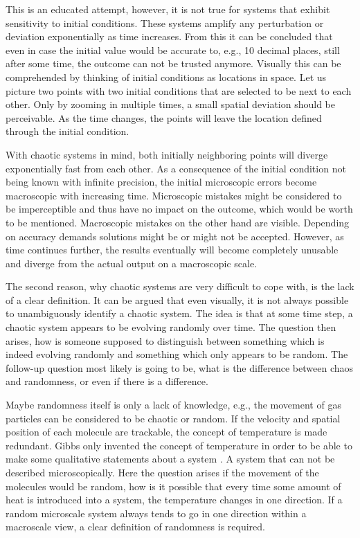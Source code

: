 This is 
an educated attempt, however, it is not true for systems that exhibit
sensitivity to initial conditions. These systems amplify any 
perturbation or deviation exponentially 
as time increases. From this it can be concluded
that even in case the initial value would be accurate to, e.g., 10 decimal places,
still after some time, the outcome can not be trusted anymore. 
Visually 
this can be comprehended by thinking of initial conditions
as locations in space. Let us picture two points with two initial conditions
that are selected to be next to each other. Only by zooming in multiple times, 
a small spatial deviation should be perceivable. 
As the time changes, the points will leave the location defined through the initial condition. \newline 


With 
chaotic systems in mind, both initially neighboring 
points will diverge exponentially fast from each other.
As a consequence of the initial condition not being
known with infinite precision, the initial microscopic
errors become macroscopic with increasing time. Microscopic mistakes 
might be considered to be imperceptible and thus have no impact 
on the outcome, which would be worth to be mentioned.
Macroscopic mistakes on the other hand are visible. Depending on 
accuracy demands solutions might be or might not be accepted.
However, as time continues further, the results eventually 
will become completely unusable and diverge from the actual output on a macroscopic scale.\newline 


The second reason, why chaotic systems are very difficult 
to cope with, is the lack of a clear definition. It can be 
argued that even visually, it is not always possible to
unambiguously identify a chaotic system. The idea 
is that at some time step, a chaotic system appears to 
be evolving randomly over time. The question then arises,
how is someone supposed to distinguish between something which 
is indeed evolving randomly and something which only appears 
to be random. The follow-up question most likely is going to be, 
what is the difference between chaos and randomness, or 
even if there is a difference. \newline 

Maybe randomness itself is only 
a lack of knowledge, e.g., the movement of gas particles 
can be considered to be chaotic or random. If the 
velocity and spatial position of each molecule are 
trackable, the concept of temperature is made 
redundant. Gibbs only invented the concept of temperature 
in order to be able to make some qualitative statements 
about a system \cite{Argyris2017}.
A system that can not be described microscopically.
Here the question arises if the movement of the molecules 
would be random, how is it possible that every time 
some amount of heat is introduced into a system, the temperature
changes in one direction. If a random microscale system 
always tends to go in one direction within a macroscale view,  
a clear definition of randomness is required. \newline

